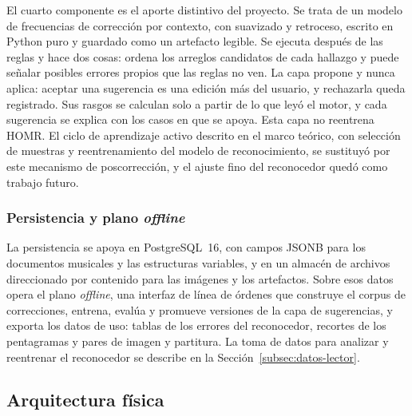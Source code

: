 \documentclass[conference]{IEEEtran}
\begin{document}
El cuarto componente es el aporte distintivo del proyecto. Se trata de un
modelo de frecuencias de corrección por contexto, con suavizado y
retroceso, escrito en Python puro y guardado como un artefacto legible. Se
ejecuta después de las reglas y hace dos cosas: ordena los arreglos
candidatos de cada hallazgo y puede señalar posibles errores propios que
las reglas no ven. La capa propone y nunca aplica: aceptar una sugerencia
es una edición más del usuario, y rechazarla queda registrado. Sus rasgos
se calculan solo a partir de lo que leyó el motor, y cada sugerencia se
explica con los casos en que se apoya.
Esta capa no reentrena HOMR. El ciclo de aprendizaje activo descrito en el
marco teórico, con selección de muestras y reentrenamiento del modelo de
reconocimiento, se sustituyó por este mecanismo de poscorrección, y el
ajuste fino del reconocedor quedó como trabajo futuro.

\subsubsection{Persistencia y plano \textit{offline}}

La persistencia se apoya en PostgreSQL~16, con campos JSONB para los
documentos musicales y las estructuras variables, y en un almacén de
archivos direccionado por contenido para las imágenes y los artefactos.
Sobre esos datos opera el plano \textit{offline}, una interfaz de línea de
órdenes que construye el corpus de correcciones, entrena, evalúa y
promueve versiones de la capa de sugerencias, y exporta los datos de uso:
tablas de los errores del reconocedor, recortes de los pentagramas y pares
de imagen y partitura.
La toma de datos para analizar y reentrenar el reconocedor se describe en
la Sección~\ref{subsec:datos-lector}.

\subsection{Arquitectura física}
\end{document}
